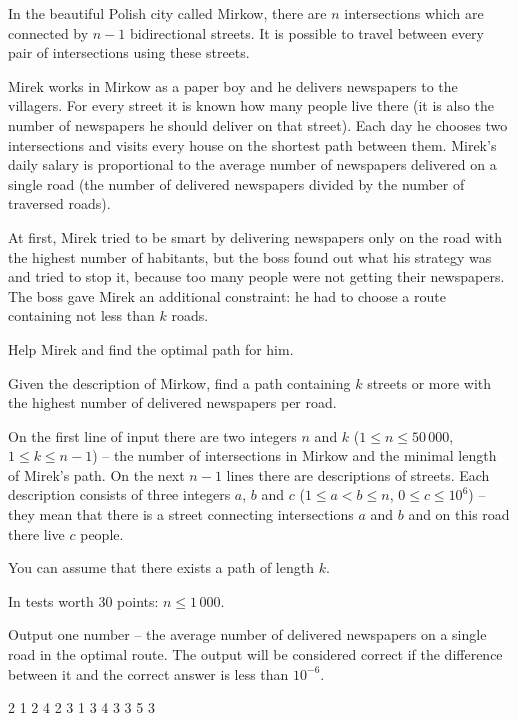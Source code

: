 

In the beautiful Polish city called Mirkow, there are $n$ intersections which are connected by $n - 1$ bidirectional streets.
It is possible to travel between every pair of intersections using these streets.

Mirek works in Mirkow as a paper boy and he delivers newspapers to the villagers.
For every street it is known how many people live there
	(it is also the number of newspapers he should deliver on that street).
Each day he chooses two intersections and visits every house on the shortest path between them.
Mirek's daily salary is proportional to the average number of newspapers delivered on a single road
	(the number of delivered newspapers divided by the number of traversed roads).

At first, Mirek tried to be smart by delivering newspapers only on the road with the highest number of habitants,
	but the boss found out what his strategy was and tried to stop it, because too many people were not getting their newspapers.
The boss gave Mirek an additional constraint: he had to choose a route containing not less than $k$ roads.

Help Mirek and find the optimal path for him.


Given the description of Mirkow, find a path containing $k$ streets or more
	with the highest number of delivered newspapers per road.


On the first line of input there are two integers $n$ and $k$ ($1 \le n \le 50\,000$, $1 \le k \le n - 1$)
	-- the number of intersections in Mirkow and the minimal length of Mirek's path.
On the next $n-1$ lines there are descriptions of streets.
Each description consists of three integers $a$, $b$ and $c$ ($1 \le a < b \le n$, $0 \le c \le 10^6$)
	-- they mean that there is a street connecting intersections $a$ and $b$ and on this road there live $c$ people.

You can assume that there exists a path of length $k$.

In tests worth $30$ points: $n \le 1\,000$.


Output one number -- the average number of delivered newspapers on a single road in the optimal route.
The output will be considered correct if the difference between it and the correct answer is less than $10^{-6}$.


 2
1 2 4
2 3 1
3 4 3
3 5 3
\sampleEND

